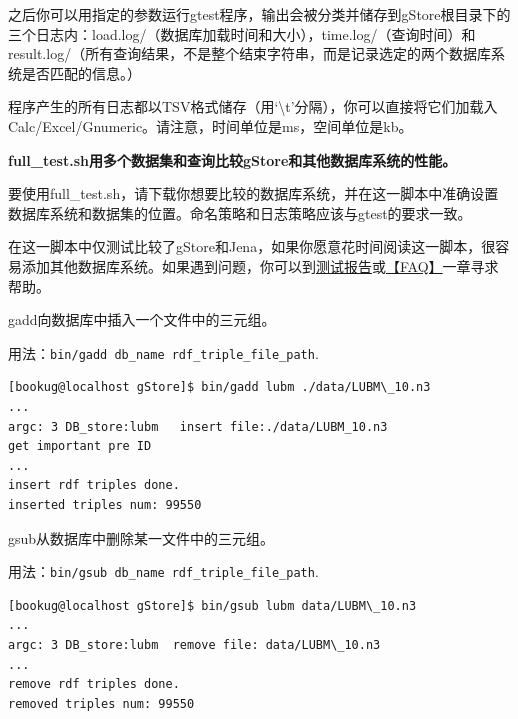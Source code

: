 \documentclass[titlepage, a4paper, 12pt]{article}
\begin{document}
之后你可以用指定的参数运行gtest程序，输出会被分类并储存到gStore根目录下的三个日志内：load.log/（数据库加载时间和大小），time.log/（查询时间）和result.log/（所有查询结果，不是整个结束字符串，而是记录选定的两个数据库系统是否匹配的信息。）

程序产生的所有日志都以TSV格式储存（用`\textbackslash{}t'分隔），你可以直接将它们加载入Calc/Excel/Gnumeric。请注意，时间单位是ms，空间单位是kb。

\textbf{full\_test.sh用多个数据集和查询比较gStore和其他数据库系统的性能。}

要使用full\_test.sh，请下载你想要比较的数据库系统，并在这一脚本中准确设置数据库系统和数据集的位置。命名策略和日志策略应该与gtest的要求一致。

在这一脚本中仅测试比较了gStore和Jena，如果你愿意花时间阅读这一脚本，很容易添加其他数据库系统。如果遇到问题，你可以到\href{run:../latex/formal_experiment.pdf}{测试报告}或\hyperref[chapter11]{【FAQ】}一章寻求帮助。


gadd向数据库中插入一个文件中的三元组。

用法：\texttt{bin/gadd db\_name rdf\_triple\_file\_path}.

\begin{verbatim}
[bookug@localhost gStore]$ bin/gadd lubm ./data/LUBM\_10.n3
...
argc: 3 DB_store:lubm   insert file:./data/LUBM_10.n3
get important pre ID
...
insert rdf triples done.
inserted triples num: 99550
\end{verbatim}


gsub从数据库中删除某一文件中的三元组。

用法：\texttt{bin/gsub db\_name rdf\_triple\_file\_path}.

\begin{verbatim}
[bookug@localhost gStore]$ bin/gsub lubm data/LUBM\_10.n3
...
argc: 3 DB_store:lubm  remove file: data/LUBM\_10.n3
...
remove rdf triples done.
removed triples num: 99550
\end{verbatim}

\end{document}
